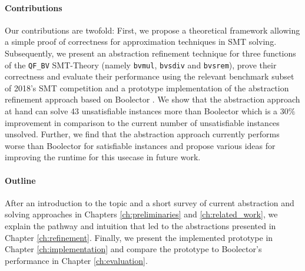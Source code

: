 \paragraph{Contributions}
Our contributions are twofold:
First, we propose a theoretical framework allowing a simple proof of correctness for approximation techniques in SMT solving.
Subsequently, we present an abstraction refinement technique for three functions of the \texttt{QF\_BV} SMT-Theory (namely \texttt{bvmul}, \texttt{bvsdiv} and \texttt{bvsrem}), prove their correctness and evaluate their performance using the relevant benchmark subset of 2018's SMT competition \cite{SMTCOMP18} and a prototype implementation of the abstraction refinement approach based on Boolector \cite{NiemetzPreinerBiere-JSAT15}.
We show that the abstraction approach at hand can solve 43 unsatisfiable instances more than Boolector which is a $30\%$ improvement in comparison to the current number of unsatisfiable instances unsolved. Further, we find that the abstraction approach currently performs worse than Boolector for satisfiable instances and propose various ideas for improving the runtime for this usecase in future work.


\paragraph{Outline}
After an introduction to the topic and a short survey of current abstraction and solving approaches in Chapters \ref{ch:preliminaries} and \ref{ch:related_work}, we explain the pathway and intuition that led to the abstractions presented in Chapter \ref{ch:refinement}. Finally, we present the implemented prototype in Chapter \ref{ch:implementation} and compare the prototype to Boolector's performance in Chapter \ref{ch:evaluation}.
